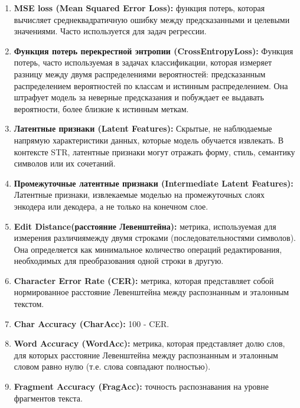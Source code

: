 \begin{enumerate}
    \item  \textbf{ MSE loss (Mean Squared Error Loss):} функция потерь, которая вычисляет среднеквадратичную ошибку между предсказанными и целевыми значениями. Часто используется для задач регрессии.

    \item \textbf{Функция потерь перекрестной энтропии (CrossEntropyLoss):} Функция потерь, часто используемая в задачах классификации, которая измеряет разницу между двумя распределениями вероятностей: предсказанным распределением вероятностей по классам и истинным распределением. Она штрафует модель за неверные предсказания и побуждает ее выдавать вероятности, более близкие к истинным меткам.

    \item  \textbf{Латентные признаки (Latent Features):} Скрытые, не наблюдаемые напрямую характеристики данных, которые модель обучается извлекать.  В контексте STR,  латентные  признаки могут  отражать форму,  стиль,  семантику  символов или их сочетаний. 

    \item  \textbf{Промежуточные латентные признаки (Intermediate Latent Features):} Латентные признаки,  извлекаемые  моделью на промежуточных слоях энкодера или декодера, а не только на конечном слое.   

    \item  \textbf{Edit Distance(расстояние Левенштейна):}  метрика, используемая для измерения различиямежду двумя строками (последовательностями символов). Она определяется как минимальное количество операций редактирования, необходимых для преобразования одной строки в другую.

    \item  \textbf{Character Error Rate (CER):}  метрика, которая представляет  собой  нормированное  расстояние  Левенштейна между  распознанным  и  эталонным  текстом. 

    \item  \textbf{Char Accuracy (CharAcc):}  100 - CER.
    
    \item  \textbf{Word Accuracy (WordAcc):}  метрика, которая представляет долю  слов,  для  которых  расстояние  Левенштейна  между  распознанным  и  эталонным  словом  равно  нулю  (т.е.  слова  совпадают  полностью).

    \item  \textbf{Fragment Accuracy (FragAcc):}  точность распознавания на уровне фрагментов текста.


\end{enumerate}
